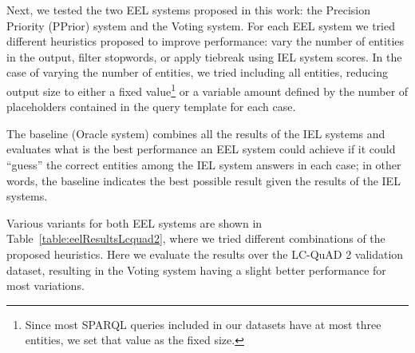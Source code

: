 Next, we tested the two EEL systems proposed in this work: the Precision Priority (PPrior) system 
and the Voting system. For each EEL system we tried different heuristics proposed to improve 
performance: vary the number of entities in the output, filter stopwords, or apply tiebreak using 
IEL system scores. In the case of varying the number of entities, we tried including all entities, 
reducing output size to either a fixed value\footnote{Since most SPARQL queries included in our 
datasets have at most three entities, we set that value as the fixed size. } or a variable amount 
defined by the number of placeholders contained in the query template for each case. 

The baseline (Oracle system) combines all the results of the IEL systems and evaluates what is 
the best performance an EEL system could achieve if it could “guess” the correct entities among 
the IEL system answers in each case; in other words, the baseline indicates the best possible 
result given the results of the IEL systems. 

Various variants for both EEL systems are shown in Table~\ref{table:eelResultsLcquad2}, where we 
tried different combinations of the proposed heuristics. Here we evaluate the results over the 
LC-QuAD 2 validation dataset, resulting in the Voting system having a slight better performance 
for most variations. 

